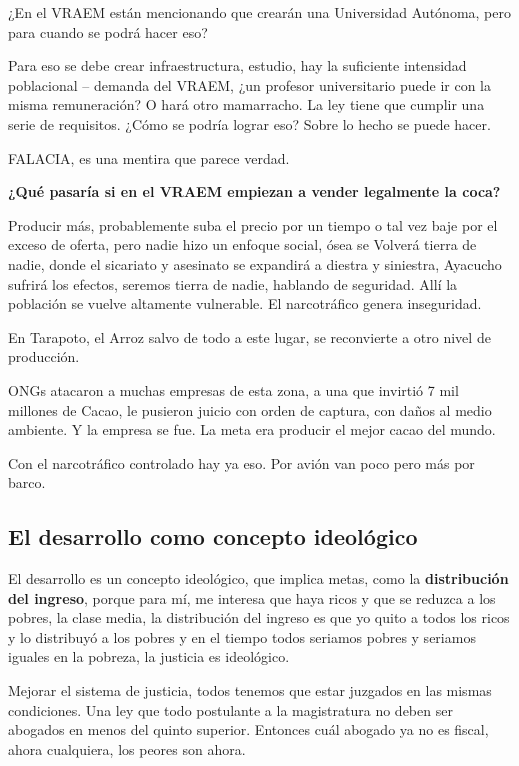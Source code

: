 \documentclass[
  letterpaper,
  DIV=11,
  numbers=noendperiod]{scrartcl}
\begin{document}
¿En el VRAEM están mencionando que crearán una Universidad Autónoma,
pero para cuando se podrá hacer eso?

Para eso se debe crear infraestructura, estudio, hay la suficiente
intensidad poblacional -- demanda del VRAEM, ¿un profesor universitario
puede ir con la misma remuneración? O hará otro mamarracho. La ley tiene
que cumplir una serie de requisitos. ¿Cómo se podría lograr eso? Sobre
lo hecho se puede hacer.

FALACIA, es una mentira que parece verdad.

\textbf{¿Qué pasaría si en el VRAEM empiezan a vender legalmente la
coca?}

Producir más, probablemente suba el precio por un tiempo o tal vez baje
por el exceso de oferta, pero nadie hizo un enfoque social, ósea se
Volverá tierra de nadie, donde el sicariato y asesinato se expandirá a
diestra y siniestra, Ayacucho sufrirá los efectos, seremos tierra de
nadie, hablando de seguridad. Allí la población se vuelve altamente
vulnerable. El narcotráfico genera inseguridad.

En Tarapoto, el Arroz salvo de todo a este lugar, se reconvierte a otro
nivel de producción.

ONGs atacaron a muchas empresas de esta zona, a una que invirtió 7 mil
millones de Cacao, le pusieron juicio con orden de captura, con daños al
medio ambiente. Y la empresa se fue. La meta era producir el mejor cacao
del mundo.

Con el narcotráfico controlado hay ya eso. Por avión van poco pero más
por barco.

\hypertarget{el-desarrollo-como-concepto-ideoluxf3gico}{%
\subsection{El desarrollo como concepto
ideológico}\label{el-desarrollo-como-concepto-ideoluxf3gico}}

El desarrollo es un concepto ideológico, que implica metas, como la
\textbf{distribución del ingreso}, porque para mí, me interesa que haya
ricos y que se reduzca a los pobres, la clase media, la distribución del
ingreso es que yo quito a todos los ricos y lo distribuyó a los pobres y
en el tiempo todos seriamos pobres y seriamos iguales en la pobreza, la
justicia es ideológico.

Mejorar el sistema de justicia, todos tenemos que estar juzgados en las
mismas condiciones. Una ley que todo postulante a la magistratura no
deben ser abogados en menos del quinto superior. Entonces cuál abogado
ya no es fiscal, ahora cualquiera, los peores son ahora.
\end{document}

